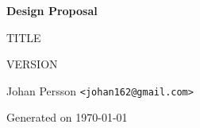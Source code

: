 \documentclass[10pt,a4paper,twoside,openright]{report}
\makeatletter
\newcommand{\reportauthor}{Johan Persson  \texttt{<johan162@gmail.com>}}
\makeatother
\begin{document}
\begin{titlepage}
  \centering
  \vspace*{2.0cm}
  {\Huge\bfseries\color{brandblue}Design Proposal\par}
  \vspace{1.2cm}
  {\Large {{TITLE}}\par}
  \vspace{0.1cm}
  {\Large {{VERSION}}\par}
  \vspace{0.8cm}
  
  \vfill
  {\large \reportauthor\par}
  {\large Generated on \today\par}
\end{titlepage}

\tableofcontents
\clearpage

\end{document}
